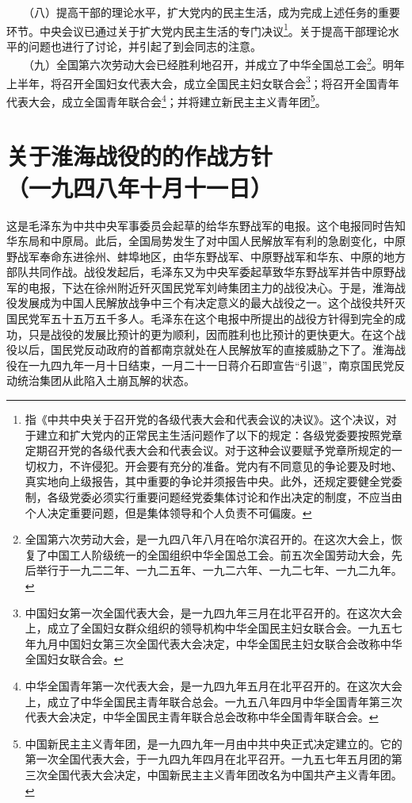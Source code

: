 \documentclass[cn,11pt,chinese]{elegantbook}
\def\myformat#1{\hfil\hfil #1}
\begin{document}
　　（八）提高干部的理论水平，扩大党内的民主生活，成为完成上述任务的重要环节。中央会议已通过关于扩大党内民主生活的专门决议\footnote[6]{ 指《中共中央关于召开党的各级代表大会和代表会议的决议》。这个决议，对于建立和扩大党内的正常民主生活问题作了以下的规定：各级党委要按照党章定期召开党的各级代表大会和代表会议。对于这种会议要赋予党章所规定的一切权力，不许侵犯。开会要有充分的准备。党内有不同意见的争论要及时地、真实地向上级报告，其中重要的争论并须报告中央。此外，还规定要健全党委制，各级党委必须实行重要问题经党委集体讨论和作出决定的制度，不应当由个人决定重要问题，但是集体领导和个人负责不可偏废。}。关于提高干部理论水平的问题也进行了讨论，并引起了到会同志的注意。\\
　　（九）全国第六次劳动大会已经胜利地召开，并成立了中华全国总工会\footnote[7]{ 全国第六次劳动大会，是一九四八年八月在哈尔滨召开的。在这次大会上，恢复了中国工人阶级统一的全国组织中华全国总工会。前五次全国劳动大会，先后举行于一九二二年、一九二五年、一九二六年、一九二七年、一九二九年。}。明年上半年，将召开全国妇女代表大会，成立全国民主妇女联合会\footnote[8]{ 中国妇女第一次全国代表大会，是一九四九年三月在北平召开的。在这次大会上，成立了全国妇女群众组织的领导机构中华全国民主妇女联合会。一九五七年九月中国妇女第三次全国代表大会决定，中华全国民主妇女联合会改称中华全国妇女联合会。}；将召开全国青年代表大会，成立全国青年联合会\footnote[9]{ 中华全国青年第一次代表大会，是一九四九年五月在北平召开的。在这次大会上，成立了中华全国民主青年联合总会。一九五八年四月中华全国青年第三次代表大会决定，中华全国民主青年联合总会改称中华全国青年联合会。}；并将建立新民主主义青年团\footnote[10]{ 中国新民主主义青年团，是一九四九年一月由中共中央正式决定建立的。它的第一次全国代表大会，于一九四九年四月在北平召开。一九五七年五月团的第三次全国代表大会决定，中国新民主主义青年团改名为中国共产主义青年团。}。\\
\newpage\section*{\myformat{关于淮海战役的的作战方针}\\\myformat{（一九四八年十月十一日）}}
\begin{introduction}\item  这是毛泽东为中共中央军事委员会起草的给华东野战军的电报。这个电报同时告知华东局和中原局。此后，全国局势发生了对中国人民解放军有利的急剧变化，中原野战军奉命东进徐州、蚌埠地区，由华东野战军、中原野战军和华东、中原的地方部队共同作战。战役发起后，毛泽东又为中央军委起草致华东野战军并告中原野战军的电报，下达在徐州附近歼灭国民党军刘峙集团主力的战役决心。于是，淮海战役发展成为中国人民解放战争中三个有决定意义的最大战役之一。这个战役共歼灭国民党军五十五万五千多人。毛泽东在这个电报中所提出的战役方针得到完全的成功，只是战役的发展比预计的更为顺利，因而胜利也比预计的更快更大。在这个战役以后，国民党反动政府的首都南京就处在人民解放军的直接威胁之下了。淮海战役在一九四九年一月十日结束，一月二十一日蒋介石即宣告“引退”，南京国民党反动统治集团从此陷入土崩瓦解的状态。\end{introduction}
\end{document}
